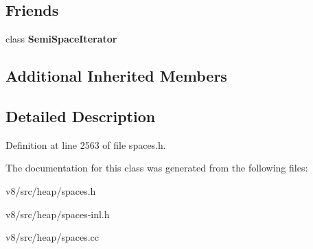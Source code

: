 \subsection*{Friends}
\begin{DoxyCompactItemize}
\item 
\mbox{\label{classv8_1_1internal_1_1NewSpace_a8b928629934cd4bbb42b079d8d3faf28}} 
class {\bfseries Semi\+Space\+Iterator}
\end{DoxyCompactItemize}
\subsection*{Additional Inherited Members}


\subsection{Detailed Description}


Definition at line 2563 of file spaces.\+h.



The documentation for this class was generated from the following files\+:\begin{DoxyCompactItemize}
\item 
v8/src/heap/spaces.\+h\item 
v8/src/heap/spaces-\/inl.\+h\item 
v8/src/heap/spaces.\+cc\end{DoxyCompactItemize}
